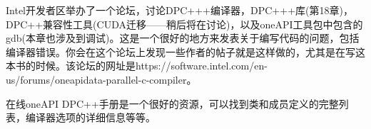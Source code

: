 Intel开发者区举办了一个论坛，讨论DPC+++编译器，DPC+++库(第18章)，DPC++兼容性工具(CUDA迁移——稍后将在讨论)，以及oneAPI工具包中包含的gdb(本章也涉及到调试)。这是一个很好的地方来发表关于编写代码的问题，包括编译器错误。你会在这个论坛上发现一些作者的帖子就是这样做的，尤其是在写这本书的时候。该论坛的网址是https://software.intel.com/en-us/forums/oneapidata-parallel-c-compiler。\par

在线oneAPI DPC++手册是一个很好的资源，可以找到类和成员定义的完整列表，编译器选项的详细信息等等。\par